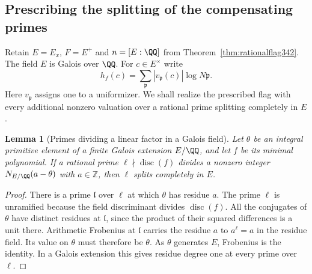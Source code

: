 \documentclass[a4paper,11pt]{article}
\newtheorem{lemma}[proposition]{Lemma}
\theoremstyle{definition}
\theoremstyle{remark}
\newcommand{\ZZ}{\mathbb Z}\newcommand{\ord}{\operatorname{ord}}
\numberwithin{equation}{section}
\begin{document}
\subsection{Prescribing the splitting of the compensating primes}\label{sec:splitflag343}
Retain $E=E_x$, $F=E^+$ and $n=[E:\QQ]$ from
Theorem~\ref{thm:rationalflag342}. The field $E$ is Galois over
$\QQ$. For $c\in E^\times$ write
\[
                  h_f(c)=\sum_{\mathfrak p}|v_{\mathfrak p}(c)|
                                      \log N\mathfrak p .
\]
Here $v_{\mathfrak p}$ assigns one to a uniformizer. We shall realize
the prescribed flag with every additional nonzero valuation over a
rational prime splitting completely in $E$.

\begin{lemma}[Primes dividing a linear factor in a Galois field]\leavevmode\label{lem:splitfactor343}
Let $\theta$ be an integral primitive element of a finite Galois
extension $E/\QQ$, and let $f$ be its minimal polynomial. If a
rational prime $\ell\nmid\operatorname{disc}(f)$ divides a nonzero
integer $N_{E/\QQ}(a-\theta)$ with $a\in\ZZ$, then $\ell$ splits
completely in $E$.
\end{lemma}
\begin{proof}
There is a prime $\mathfrak l$ over $\ell$ at which $\theta$ has
residue $a$. The prime $\ell$ is unramified because the field
discriminant divides $\operatorname{disc}(f)$. All the conjugates of
$\theta$ have distinct residues at $\mathfrak l$, since the product
of their squared differences is a unit there. Arithmetic Frobenius
at $\mathfrak l$ carries the residue $a$ to $a^\ell=a$ in the
residue field. Its value on $\theta$ must therefore be $\theta$.
As $\theta$ generates $E$, Frobenius is the identity. In a Galois
extension this gives residue degree one at every prime over $\ell$.
\end{proof}
\end{document}

